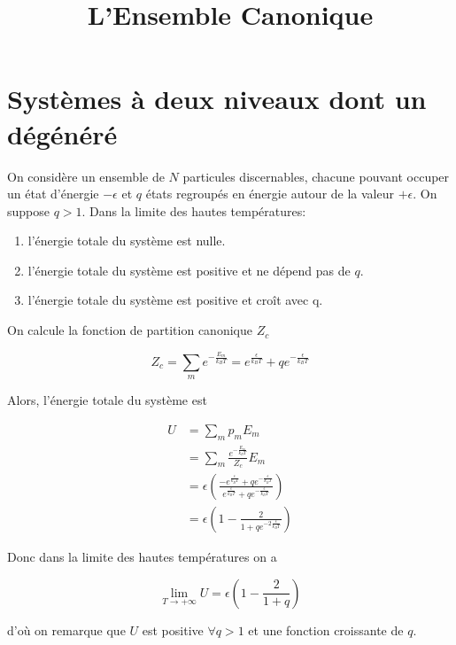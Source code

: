 \documentclass[french]{article}
\begin{document}
	\title{L'Ensemble Canonique}
	\author{}
	\date{}
	
	\maketitle
	
	\section{Systèmes à deux niveaux dont un dégénéré}
	\begin{tcolorbox}[colback=blue!5!white,colframe=blue!75!black]
		\quad On considère un ensemble de $N$ particules discernables, chacune pouvant occuper un état d’énergie $-\epsilon$ et $q$ états regroupés en énergie autour de la valeur $+\epsilon$. On suppose $q > 1$. Dans la limite des hautes températures:
		\begin{enumerate}
			\item l'énergie totale du système est nulle.
			\item l'énergie totale du système est positive et ne dépend pas de $q$.
			\item l'énergie totale du système est positive et croît avec q.
		\end{enumerate}
	\end{tcolorbox}

	On calcule la fonction de partition canonique $Z_c$
	
	$$ Z_c = \sum_{m}e^{-\frac{E_m}{k_B T}} =  e^{\frac{\epsilon}{k_B T}} + q e^{-\frac{\epsilon}{k_B T}} $$
	
	Alors, l'énergie totale du système est
	
	\begin{align}
		U &= \sum_{m} p_m E_m \\
		&= \sum_{m} \frac{e^{-\frac{E_m}{k_B T}}}{Z_c} E_m \\
		&= \epsilon \left(\frac{-e^{\frac{\epsilon}{k_B T}} + qe^{-\frac{\epsilon}{k_B T}}}{e^{\frac{\epsilon}{k_B T}} + q e^{-\frac{\epsilon}{k_B T}}}\right) \\
		&= \epsilon \left(1 - \frac{2}{1+ qe^{-2\frac{\epsilon}{k_B T}}}\right)
	\end{align}
	
	Donc dans la limite des hautes températures on a
	
	$$ \lim_{T \to +\infty} U = \epsilon \left(1 - \frac{2}{1 + q}\right)$$
	
	d'où on remarque que $U$ est positive $\forall q > 1$ et une fonction croissante de $q$.
	
\end{document}
